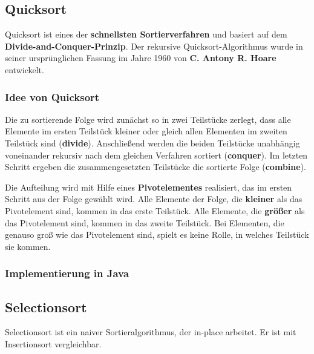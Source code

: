 \documentclass[11pt, a4paper, titlepage, oneside]{article}
\renewcommand{\emph}{\textbf}
\begin{document}
	
	
	\subsection{Quicksort}
	
	Quicksort ist eines der \emph{schnellsten Sortierverfahren} und basiert auf dem \emph{Divide-and-Conquer-Prinzip}. Der rekursive Quicksort-Algorithmus wurde in seiner ursprünglichen Fassung im Jahre 1960 von \emph{C. Antony R. Hoare} entwickelt.
	
	\subsubsection{Idee von Quicksort}
	
	Die zu sortierende Folge wird zunächst so in zwei Teilstücke zerlegt, dass alle Elemente im ersten Teilstück kleiner oder gleich allen Elementen im zweiten Teilstück sind (\emph{divide}). Anschließend werden die beiden Teilstücke unabhängig voneinander rekursiv nach dem gleichen Verfahren sortiert (\emph{conquer}). Im letzten Schritt ergeben die zusammengesetzten Teilstücke die sortierte Folge (\emph{combine}).
	
	Die Aufteilung wird mit Hilfe eines \emph{Pivotelementes} realisiert, das im ersten Schritt aus der Folge gewählt wird. Alle Elemente der Folge, die \emph{kleiner} als das Pivotelement sind, kommen in das erste Teilstück. Alle Elemente, die \emph{größer} als das Pivotelement sind, kommen in das zweite Teilstück. Bei Elementen, die genauso groß wie das Pivotelement sind, spielt es keine Rolle, in welches Teilstück sie kommen.
	
	\subsubsection{Implementierung in Java}
	
	
	
	\subsection{Selectionsort}
	
	Selectionsort ist ein naiver Sortieralgorithmus, der in-place arbeitet. Er ist mit Insertionsort vergleichbar.
	
\end{document}

